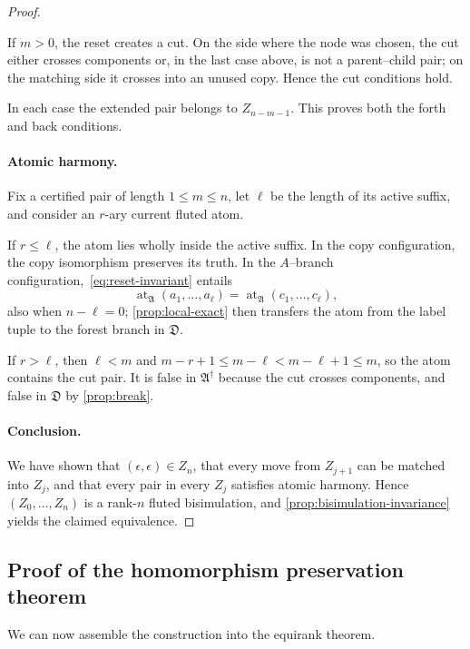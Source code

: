 \documentclass{lmcs}
\newcommand{\at}{\operatorname{at}}
\newcommand{\A}{\mathfrak{A}}
\newcommand{\D}{\mathfrak{D}}
\begin{document}
\begin{proof}
\begin{enumerate}[label=\textup{(\roman*)}]
If $m>0$, the reset creates a cut.  On the side where the node was chosen,
the cut either crosses components or, in the last case above, is not a
parent--child pair; on the matching side it crosses into an unused copy.
Hence the cut conditions hold.
\end{enumerate}
In each case the extended pair belongs to $Z_{n-m-1}$.  This proves both the
forth and back conditions.

\paragraph{Atomic harmony.}
Fix a certified pair of length $1\leq m\leq n$, let $\ell$ be the length of
its active suffix, and consider an $r$-ary current fluted atom.

If $r\leq\ell$, the atom lies wholly inside the active suffix.  In the copy
configuration, the copy isomorphism preserves its truth.  In the
$A$--branch configuration,~\eqref{eq:reset-invariant} entails
\[
   \at_{\A}(a_1,\ldots,a_\ell)
   =
   \at_{\A}(c_1,\ldots,c_\ell),
\]
also when $n-\ell=0$; \cref{prop:local-exact} then transfers the atom from the
label tuple to the forest branch in $\D$.

If $r>\ell$, then $\ell<m$ and
$m-r+1\leq m-\ell<m-\ell+1\leq m$, so the atom contains the cut pair.  It is
false in $\A^{\dagger}$ because the cut crosses components, and false in
$\D$ by \cref{prop:break}.

\paragraph{Conclusion.}
We have shown that $(\epsilon,\epsilon)\in Z_n$, that every move from
$Z_{j+1}$ can be matched into $Z_j$, and that every pair in every $Z_j$
satisfies atomic harmony.  Hence $(Z_0,\ldots,Z_n)$ is a rank-$n$ fluted
bisimulation, and
\cref{prop:bisimulation-invariance} yields the claimed equivalence.
\end{proof}


\subsection{Proof of the homomorphism preservation theorem}\label{sec:hpt-proof}

We can now assemble the construction into the equirank theorem.
\end{document}
